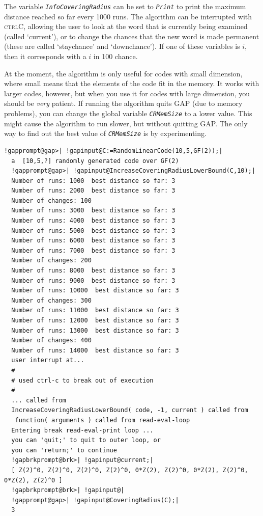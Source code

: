 \documentclass[a4paper,11pt]{report}
\begin{document}
{{{ The variable \mbox{\texttt{\mdseries\slshape InfoCoveringRadius}} can be set to \mbox{\texttt{\mdseries\slshape Print}} to print the maximum distance reached so far every 1000 runs. The algorithm
can be interrupted with \textsc{ctrl\texttt{}C}, allowing the user to look at the word that is currently being examined
(called `current'), or to change the chances that the new word is made
permanent (these are called `staychance' and `downchance'). If one of these
variables is $i$, then it corresponds with a $i$ in 100 chance. 

 At the moment, the algorithm is only useful for codes with small dimension,
where small means that the elements of the code fit in the memory. It works
with larger codes, however, but when you use it for codes with large
dimension, you should be \emph{very} patient. If running the algorithm quits GAP (due to memory problems), you can
change the global variable \mbox{\texttt{\mdseries\slshape CRMemSize}} to a lower value. This might cause the algorithm to run slower, but without
quitting GAP. The only way to find out the best value of \mbox{\texttt{\mdseries\slshape CRMemSize}} is by experimenting. }

  
\begin{Verbatim}[commandchars=!@|,fontsize=\small,frame=single,label=Example]
  !gapprompt@gap>| !gapinput@C:=RandomLinearCode(10,5,GF(2));|
  a  [10,5,?] randomly generated code over GF(2)
  !gapprompt@gap>| !gapinput@IncreaseCoveringRadiusLowerBound(C,10);|
  Number of runs: 1000  best distance so far: 3
  Number of runs: 2000  best distance so far: 3
  Number of changes: 100
  Number of runs: 3000  best distance so far: 3
  Number of runs: 4000  best distance so far: 3
  Number of runs: 5000  best distance so far: 3
  Number of runs: 6000  best distance so far: 3
  Number of runs: 7000  best distance so far: 3
  Number of changes: 200
  Number of runs: 8000  best distance so far: 3
  Number of runs: 9000  best distance so far: 3
  Number of runs: 10000  best distance so far: 3
  Number of changes: 300
  Number of runs: 11000  best distance so far: 3
  Number of runs: 12000  best distance so far: 3
  Number of runs: 13000  best distance so far: 3
  Number of changes: 400
  Number of runs: 14000  best distance so far: 3
  user interrupt at... 
  #
  # used ctrl-c to break out of execution
  #
  ... called from 
  IncreaseCoveringRadiusLowerBound( code, -1, current ) called from
   function( arguments ) called from read-eval-loop
  Entering break read-eval-print loop ...
  you can 'quit;' to quit to outer loop, or
  you can 'return;' to continue
  !gapbrkprompt@brk>| !gapinput@current;|
  [ Z(2)^0, Z(2)^0, Z(2)^0, Z(2)^0, 0*Z(2), Z(2)^0, 0*Z(2), Z(2)^0, 0*Z(2), Z(2)^0 ]
  !gapbrkprompt@brk>| !gapinput@|
  !gapprompt@gap>| !gapinput@CoveringRadius(C);|
  3
\end{Verbatim}
  

}}
\end{document}
